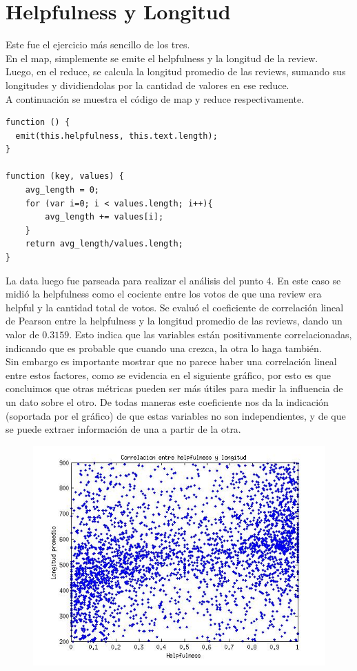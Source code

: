 \documentclass{article}
\begin{document}
\section{Helpfulness y Longitud}

 Este fue el ejercicio m\'as sencillo de los tres.
\\ En el map, simplemente se emite el helpfulness y la longitud de la review.
\\ Luego, en el reduce, se calcula la longitud promedio de las reviews, sumando sus longitudes y dividiendolas por la cantidad de valores en ese reduce.
\\ A continuaci\'on se muestra el c\'odigo de map y reduce respectivamente.

\begin{lstlisting}
function () {
  emit(this.helpfulness, this.text.length);
}

function (key, values) { 
    avg_length = 0;
    for (var i=0; i < values.length; i++){
        avg_length += values[i];
    }
    return avg_length/values.length;
}
\end{lstlisting}
La data luego fue parseada para realizar el an\'alisis del punto 4. En este caso se midi\'o la helpfulness como el cociente entre los votos de que una review era helpful y la cantidad total de votos. Se evalu\'o el coeficiente de correlaci\'on lineal de Pearson entre la helpfulness y la longitud promedio de las reviews, dando un valor de $0.3159$. Esto indica que las variables est\'an positivamente correlacionadas, indicando que es probable que cuando una crezca, la otra lo haga tambi\'en.
\\ Sin embargo es importante mostrar que no parece haber una correlaci\'on lineal entre estos factores, como se evidencia en el siguiente gr\'afico, por esto es que concluimos que otras m\'etricas pueden ser m\'as \'utiles para medir la influencia de un dato sobre el otro. De todas maneras este coeficiente nos da la indicaci\'on (soportada por el gr\'afico) de que estas variables no son independientes, y de que se puede extraer informaci\'on de una a partir de la otra.

\begin{figure}[htb]
\centering
\includegraphics[scale=0.65]{corr.jpg}
\end{figure}
\end{document}
